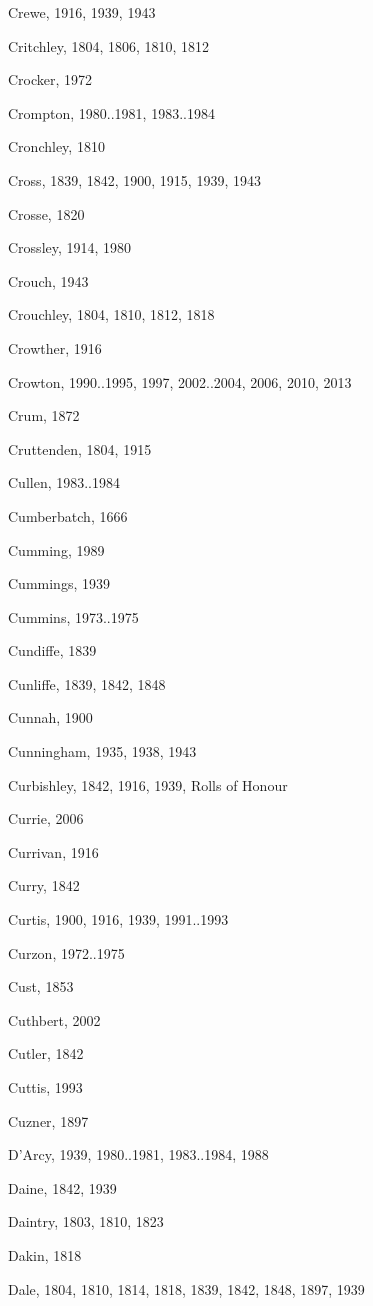 {\begin{theindex}
\item Crewe, 1916, 1939, 1943
\item Critchley, 1804, 1806, 1810, 1812
\item Crocker, 1972
\item Crompton, 1980..1981, 1983..1984
\item Cronchley, 1810
\item Cross, 1839, 1842, 1900, 1915, 1939, 1943
\item Crosse, 1820
\item Crossley, 1914, 1980
\item Crouch, 1943
\item Crouchley, 1804, 1810, 1812, 1818
\item Crowther, 1916
\item Crowton, 1990..1995, 1997, 2002..2004, 2006, 2010, 2013
\item Crum, 1872
\item Cruttenden, 1804, 1915
\item Cullen, 1983..1984
\item Cumberbatch, 1666
\item Cumming, 1989
\item Cummings, 1939
\item Cummins, 1973..1975
\item Cundiffe, 1839
\item Cunliffe, 1839, 1842, 1848
\item Cunnah, 1900
\item Cunningham, 1935, 1938, 1943
\item Curbishley, 1842, 1916, 1939, Rolls of Honour
\item Currie, 2006
\item Currivan, 1916
\item Curry, 1842
\item Curtis, 1900, 1916, 1939, 1991..1993
\item Curzon, 1972..1975
\item Cust, 1853
\item Cuthbert, 2002
\item Cutler, 1842
\item Cuttis, 1993
\item Cuzner, 1897
\item D'Arcy, 1939, 1980..1981, 1983..1984, 1988
\item Daine, 1842, 1939
\item Daintry, 1803, 1810, 1823
\item Dakin, 1818
\item Dale, 1804, 1810, 1814, 1818, 1839, 1842, 1848, 1897, 1939

\end{theindex}}
